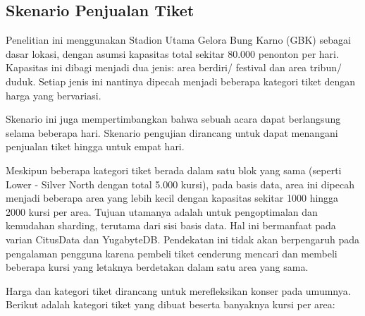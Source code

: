 \subsection{Skenario Penjualan Tiket}

Penelitian ini menggunakan Stadion Utama Gelora Bung Karno (GBK) sebagai dasar lokasi, dengan asumsi kapasitas total sekitar 80.000 penonton per hari. Kapasitas ini dibagi menjadi dua jenis: area berdiri/ festival dan area tribun/ duduk. Setiap jenis ini nantinya dipecah menjadi beberapa kategori tiket dengan harga yang bervariasi.

Skenario ini juga mempertimbangkan bahwa sebuah acara dapat berlangsung selama beberapa hari. Skenario pengujian dirancang untuk dapat menangani penjualan tiket hingga untuk empat hari.

Meskipun beberapa kategori tiket berada dalam satu blok yang sama (seperti Lower - Silver North dengan total 5.000 kursi), pada basis data, area ini dipecah menjadi beberapa area yang lebih kecil dengan kapasitas sekitar 1000 hingga 2000 kursi per area. Tujuan utamanya adalah untuk pengoptimalan dan kemudahan sharding, terutama dari sisi basis data. Hal ini bermanfaat pada varian CitusData dan YugabyteDB. Pendekatan ini tidak akan berpengaruh pada pengalaman pengguna karena pembeli tiket cenderung mencari dan membeli beberapa kursi yang letaknya berdetakan dalam satu area yang sama.

Harga dan kategori tiket dirancang untuk merefleksikan konser pada umumnya. Berikut adalah kategori tiket yang dibuat beserta banyaknya kursi per area:

